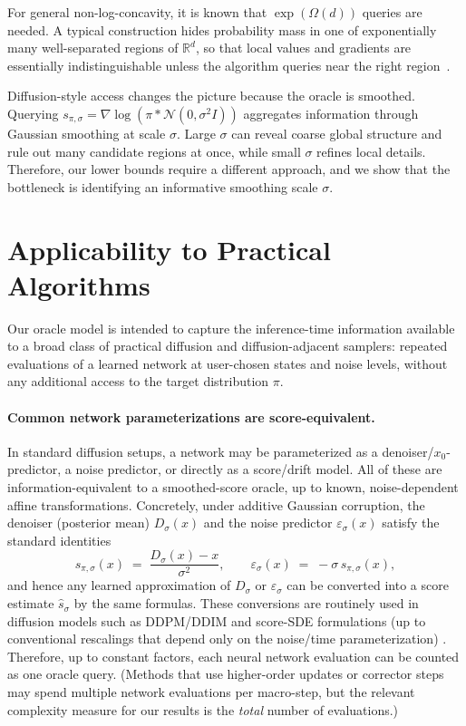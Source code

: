 \documentclass[11pt,letterpaper]{article}
\newcommand{\R}{\mathbb{R}}
\newcommand{\1}{\mathbbm{1}}
\begin{document}
For general non-log-concavity, it is known that $\exp(\Omega(d))$ queries are needed. 
A typical construction hides probability mass in one of exponentially many well-separated regions of $\R^d$, so that local values and gradients are essentially indistinguishable unless the algorithm queries near the right region~\citep{LRG, he2025nonlogconcave, chewi2022fisherinfo}.

Diffusion-style access changes the picture because the oracle is smoothed.
Querying $s_{\pi,\sigma}=\nabla\log(\pi*\mathcal N(0,\sigma^2I))$ aggregates information through Gaussian smoothing at scale $\sigma$.
Large $\sigma$ can reveal coarse global structure and rule out many candidate regions at once, while small $\sigma$ refines local details.
Therefore, our lower bounds require a different approach, and we show that the bottleneck is identifying an informative smoothing scale $\sigma$.




\section{Applicability to Practical Algorithms}
\label{sec:applicability}

Our oracle model is intended to capture the inference-time information available to a broad class of
practical diffusion and diffusion-adjacent samplers: repeated evaluations of a learned network at
user-chosen states and noise levels, without any additional access to the target distribution $\pi$.

\paragraph{Common network parameterizations are score-equivalent.}
In standard diffusion setups, a network may be parameterized as a denoiser/$x_0$-predictor, a noise predictor, or directly as a score/drift model.
All of these are information-equivalent to a smoothed-score oracle, up to known, noise-dependent affine transformations.
Concretely, under additive Gaussian corruption, the denoiser (posterior mean) $D_\sigma(x)$ and the noise predictor $\varepsilon_\sigma(x)$ satisfy the standard identities
\[
  s_{\pi,\sigma}(x) \;=\; \frac{D_\sigma(x)-x}{\sigma^2},
  \qquad
  \varepsilon_\sigma(x) \;=\; -\sigma\, s_{\pi,\sigma}(x),
\]
and hence any learned approximation of $D_\sigma$ or $\varepsilon_\sigma$ can be converted into a score estimate $\widehat s_\sigma$ by the same formulas.
These conversions are routinely used in diffusion models such as DDPM/DDIM and score-SDE formulations (up to conventional rescalings that depend only on the noise/time parameterization)
\citep{ho2020ddpm,song2021score_sde, karras2022edm, ddim}.
Therefore, up to constant factors, each neural network evaluation can be counted as one oracle query.
(Methods that use higher-order updates or corrector steps may spend multiple network evaluations per
macro-step, but the relevant complexity measure for our results is the \emph{total} number of evaluations.)
\end{document}
